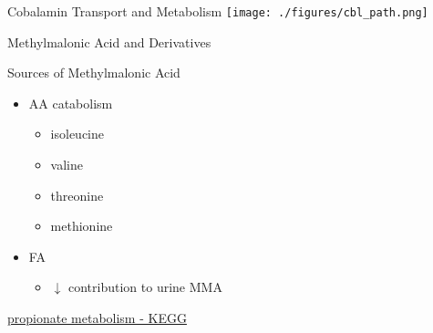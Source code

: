 \documentclass[presentation, smaller]{beamer}
\begin{document}
\begin{frame}[label={sec:orgheadline7}]{Cobalamin Transport and Metabolism}
\texttt{[image: ./figures/cbl\_path.png]}
\end{frame}

\begin{frame}[label={sec:orgheadline8}]{Methylmalonic Acid and Derivatives}
\centering
\vspace{6em}
\hspace{2em}
\hspace{2em}
\end{frame}

\begin{frame}[label={sec:orgheadline9}]{Sources of Methylmalonic Acid}
\begin{itemize}
\item AA catabolism
\begin{itemize}
\item isoleucine
\item valine
\item threonine
\item methionine
\end{itemize}
\item FA
\begin{itemize}
\item \(\downarrow\) contribution to urine MMA
\end{itemize}
\end{itemize}

\href{http://www.genome.jp/kegg-bin/show_pathway?org_name=hsa&mapno=00640&mapscale=&show_description=hide}{propionate metabolism - KEGG}
\end{frame}
\end{document}
